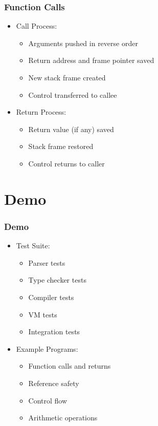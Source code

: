 \documentclass{beamer}
\begin{document}
\begin{frame}
\frametitle{Function Calls}
\begin{itemize}
    \item Call Process:
    \begin{itemize}
        \item Arguments pushed in reverse order
        \item Return address and frame pointer saved
        \item New stack frame created
        \item Control transferred to callee
    \end{itemize}
    \item Return Process:
    \begin{itemize}
        \item Return value (if any) saved
        \item Stack frame restored
        \item Control returns to caller
    \end{itemize}
\end{itemize}
\end{frame}

\section{Demo}
\begin{frame}
\frametitle{Demo}
\begin{itemize}
    \item Test Suite:
    \begin{itemize}
        \item Parser tests
        \item Type checker tests
        \item Compiler tests
        \item VM tests
        \item Integration tests
    \end{itemize}
    \item Example Programs:
    \begin{itemize}
        \item Function calls and returns
        \item Reference safety
        \item Control flow
        \item Arithmetic operations
    \end{itemize}
\end{itemize}
\end{frame}
\end{document}
